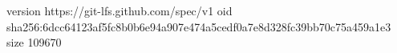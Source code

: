 version https://git-lfs.github.com/spec/v1
oid sha256:6dcc64123af5fc8b0b6e94a907e474a5cedf0a7e8d328fc39bb70c75a459a1e3
size 109670
